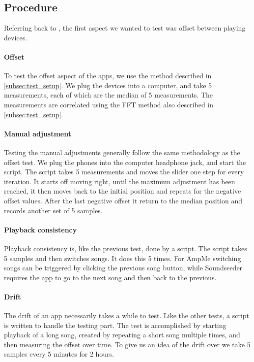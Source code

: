 \subsection{Procedure}\label{subsec:procedure}

Referring back to , the
first aspect we wanted to test was offset between playing devices.

\paragraph{Offset}
To test the offset aspect of the apps, we use the method described in
\cref{subsec:test_setup}. We plug the devices into a computer, and take
5 measurements, each of which are the median of 5 measurements. The
measurements are correlated using the \ac{FFT} method also described in
\cref{subsec:test_setup}.

\paragraph{Manual adjustment}
Testing the manual adjustments generally follow the same methodology as
the offset test. We plug the phones into the computer headphone jack,
and start the script. The script takes 5 measurements and moves the
slider one step for every iteration. It starts off moving right, until
the maximum adjustment has been reached, it then moves back to the
initial position and repeats for the negative offset values. After the
last negative offset it return to the median position and records
another set of 5 samples.

\paragraph{Playback consistency}
Playback consistency is, like the previous test, done by a script. The
script takes 5 samples and then switches songs. It does this 5 times.
For AmpMe switching songs can be triggered by clicking the previous song
button, while Soundseeder requires the app to go to the next song and
then back to the previous.

\paragraph{Drift}
The drift of an app necessarily takes a while to test. Like the other
tests, a script is written to handle the testing part. The test is
accomplished by starting playback of a long song, created by repeating
a short song multiple times, and then measuring the offset over time. To
give us an idea of the drift over we take 5 samples every 5 minutes for
2 hours.
